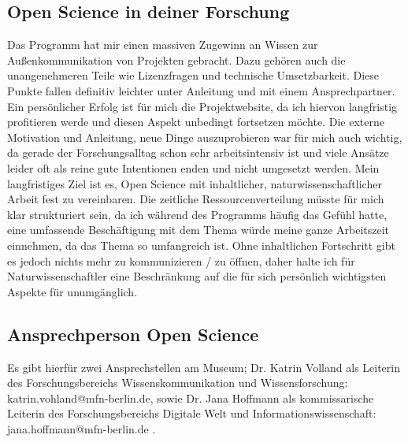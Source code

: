 \documentclass[11pt,a4paper]{article}
\begin{document}
\subsection{Open Science in deiner Forschung}
Das Programm hat mir einen massiven Zugewinn an Wissen zur Außenkommunikation von Projekten gebracht. Dazu gehören auch die unangenehmeren Teile wie Lizenzfragen und technische Umsetzbarkeit. Diese Punkte fallen definitiv leichter unter Anleitung und mit einem Ansprechpartner. Ein persönlicher Erfolg ist für mich die Projektwebsite, da ich hiervon langfristig profitieren werde und diesen Aspekt unbedingt fortsetzen möchte. Die externe Motivation und Anleitung, neue Dinge auszuprobieren war für mich auch wichtig, da gerade der Forschungsalltag schon sehr arbeitsintensiv ist und viele Ansätze leider oft als reine gute Intentionen enden und nicht umgesetzt werden. 
Mein langfristiges Ziel ist es, Open Science mit inhaltlicher, naturwissenschaftlicher Arbeit fest zu vereinbaren. Die zeitliche Ressourcenverteilung müsste für mich klar strukturiert sein, da ich während des Programms häufig das Gefühl hatte, eine umfassende Beschäftigung mit dem Thema würde meine ganze Arbeitszeit einnehmen, da das Thema so umfangreich ist. Ohne inhaltlichen Fortschritt gibt es jedoch nichts mehr zu kommunizieren / zu öffnen, daher halte ich für Naturwissenschaftler eine Beschränkung auf die für sich persönlich wichtigsten Aspekte für unumgänglich.


\subsection{Ansprechperson Open Science}
Es gibt hierfür zwei Ansprechstellen am Museum; Dr. Katrin Volland als Leiterin des Forschungsbereichs Wissenskommunikation und Wissensforschung: katrin.vohland@mfn-berlin.de, sowie Dr. Jana Hoffmann als kommissarische Leiterin des Forschungsbereichs Digitale Welt und Informationswissenschaft: jana.hoffmann@mfn-berlin.de .
\end{document}

